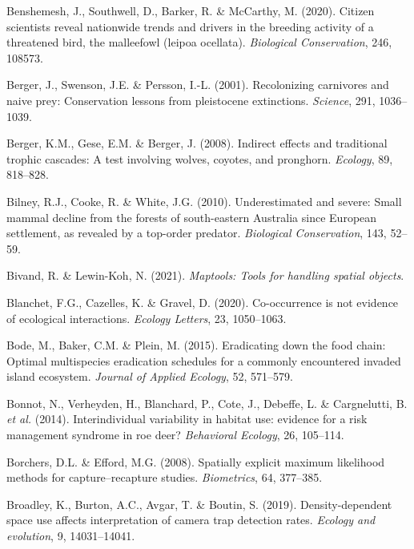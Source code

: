 \documentclass[11pt,a4paper,titlepage,twoside,openright]{style/unimelbthesis}
\begin{document}
\begin{mainmatter}
\leavevmode\hypertarget{ref-benshemesh2020citizen}{}%
Benshemesh, J., Southwell, D., Barker, R. \& McCarthy, M. (2020). Citizen scientists reveal nationwide trends and drivers in the breeding activity of a threatened bird, the malleefowl (leipoa ocellata). \emph{Biological Conservation}, 246, 108573.

\leavevmode\hypertarget{ref-berger2001recolonizing}{}%
Berger, J., Swenson, J.E. \& Persson, I.-L. (2001). Recolonizing carnivores and naive prey: Conservation lessons from pleistocene extinctions. \emph{Science}, 291, 1036--1039.

\leavevmode\hypertarget{ref-berger2008indirect}{}%
Berger, K.M., Gese, E.M. \& Berger, J. (2008). Indirect effects and traditional trophic cascades: A test involving wolves, coyotes, and pronghorn. \emph{Ecology}, 89, 818--828.

\leavevmode\hypertarget{ref-bilney2010underestimated}{}%
Bilney, R.J., Cooke, R. \& White, J.G. (2010). Underestimated and severe: Small mammal decline from the forests of south-eastern Australia since European settlement, as revealed by a top-order predator. \emph{Biological Conservation}, 143, 52--59.

\leavevmode\hypertarget{ref-maptools}{}%
Bivand, R. \& Lewin-Koh, N. (2021). \emph{Maptools: Tools for handling spatial objects}.

\leavevmode\hypertarget{ref-guillaume2020co-occurrence}{}%
Blanchet, F.G., Cazelles, K. \& Gravel, D. (2020). Co-occurrence is not evidence of ecological interactions. \emph{Ecology Letters}, 23, 1050--1063.

\leavevmode\hypertarget{ref-bode2015eradicating}{}%
Bode, M., Baker, C.M. \& Plein, M. (2015). Eradicating down the food chain: Optimal multispecies eradication schedules for a commonly encountered invaded island ecosystem. \emph{Journal of Applied Ecology}, 52, 571--579.

\leavevmode\hypertarget{ref-bonnot2014interindividual}{}%
Bonnot, N., Verheyden, H., Blanchard, P., Cote, J., Debeffe, L. \& Cargnelutti, B. \emph{et al.} (2014). Interindividual variability in habitat use: evidence for a risk management syndrome in roe deer? \emph{Behavioral Ecology}, 26, 105--114.

\leavevmode\hypertarget{ref-borchers2008spatially}{}%
Borchers, D.L. \& Efford, M.G. (2008). Spatially explicit maximum likelihood methods for capture--recapture studies. \emph{Biometrics}, 64, 377--385.

\leavevmode\hypertarget{ref-broadley2019density}{}%
Broadley, K., Burton, A.C., Avgar, T. \& Boutin, S. (2019). Density-dependent space use affects interpretation of camera trap detection rates. \emph{Ecology and evolution}, 9, 14031--14041.


\end{mainmatter}
\end{document}
